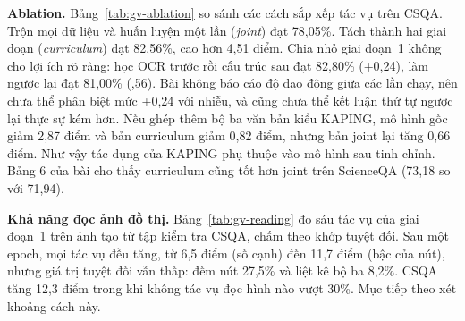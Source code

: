 \begin{table}[t]
\centering
\caption{Kết quả VQA do tác giả công bố (\%)}
\label{tab:gv-vqa}
\small
\setlength{\tabcolsep}{3pt}
\end{table}

\textbf{Ablation.} Bảng~\ref{tab:gv-ablation} so sánh các cách sắp xếp tác vụ trên CSQA. Trộn mọi dữ liệu và huấn luyện một lần (\emph{joint}) đạt 78,05\%. Tách thành hai giai đoạn (\emph{curriculum}) đạt 82,56\%, cao hơn 4,51 điểm. Chia nhỏ giai đoạn~1 không cho lợi ích rõ ràng: học OCR trước rồi cấu trúc sau đạt 82,80\% (+0,24), làm ngược lại đạt 81,00\% (,56). Bài không báo cáo độ dao động giữa các lần chạy, nên chưa thể phân biệt mức +0,24 với nhiễu, và cũng chưa thể kết luận thứ tự ngược lại thực sự kém hơn. Nếu ghép thêm bộ ba văn bản kiểu KAPING, mô hình gốc giảm 2,87 điểm và bản curriculum giảm 0,82 điểm, nhưng bản joint lại tăng 0,66 điểm. Như vậy tác dụng của KAPING phụ thuộc vào mô hình sau tinh chỉnh. Bảng 6 của bài cho thấy curriculum cũng tốt hơn joint trên ScienceQA (73,18 so với 71,94).

\begin{table}[t]
\centering
\caption{Ablation trên CSQA do tác giả công bố (độ chính xác, \%)}
\label{tab:gv-ablation}
\small
{}
\end{table}

\textbf{Khả năng đọc ảnh đồ thị.} Bảng~\ref{tab:gv-reading} đo sáu tác vụ của giai đoạn~1 trên ảnh tạo từ tập kiểm tra CSQA, chấm theo khớp tuyệt đối. Sau một epoch, mọi tác vụ đều tăng, từ 6,5 điểm (số cạnh) đến 11,7 điểm (bậc của nút), nhưng giá trị tuyệt đối vẫn thấp: đếm nút 27,5\% và liệt kê bộ ba 8,2\%. CSQA tăng 12,3 điểm trong khi không tác vụ đọc hình nào vượt 30\%. Mục tiếp theo xét khoảng cách này.

